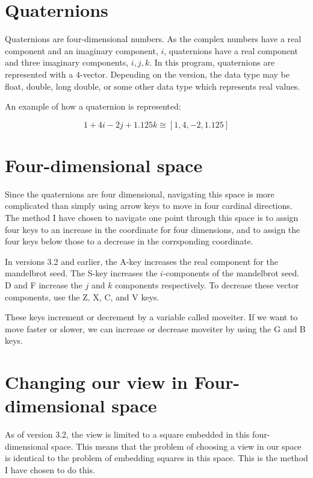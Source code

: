 \documentclass[a4paper]{article}
\begin{document}
\section{Quaternions}

Quaternions are four-dimensional numbers.  As the complex numbers have a real component and an imaginary component, $i$, quaternions have a real component and three imaginary components, $i, j, k$.  In this program, quaternions are represented with a 4-vector.  Depending on the version, the data type may be float, double, long double, or some other data type which represents real values.

An example of how a quaternion is represented:

$$1 + 4i - 2j + 1.125k \cong [ 1, 4, -2, 1.125 ]$$

\section{Four-dimensional space}

Since the quaternions are four dimensional, navigating this space is more complicated than simply using arrow keys to move in four cardinal directions.  The method I have chosen to navigate one point through this space is to assign four keys to an increase in the coordinate for four dimensions, and to assign the four keys below those to a decrease in the corrsponding coordinate.

In versions 3.2 and earlier, the A-key increases the real component for the mandelbrot seed.  The S-key increases the $i$-components of the mandelbrot seed.  D and F increase the $j$ and $k$ components respectively.  To decrease these vector components, use the Z, X, C, and V keys.

These keys increment or decrement by a variable called moveiter.  If we want to move faster or slower, we can increase or decrease moveiter by using the G and B keys.

\section{Changing our view in Four-dimensional space}

As of version 3.2, the view is limited to a square embedded in this four-dimensional space.  This means that the problem of choosing a view in our space is identical to the problem of embedding squares in this space.  This is the method I have chosen to do this.
\end{document}
